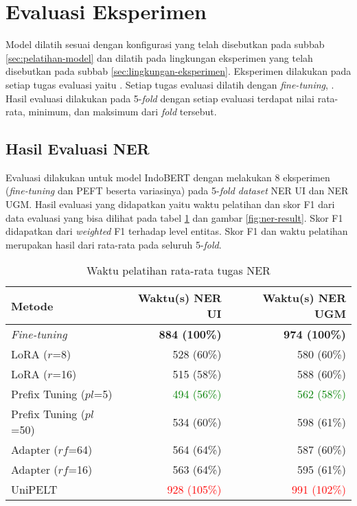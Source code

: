 \section{Evaluasi Eksperimen}

Model dilatih sesuai dengan konfigurasi yang telah disebutkan pada subbab \ref{sec:pelatihan-model} dan dilatih pada lingkungan eksperimen yang telah disebutkan pada subbab \ref{sec:lingkungan-eksperimen}. Eksperimen dilakukan pada setiap tugas evaluasi yaitu \nlptask. Setiap tugas evaluasi dilatih dengan \textit{fine-tuning}, \methodPEFT. Hasil evaluasi dilakukan pada 5-\textit{fold} dengan setiap evaluasi terdapat nilai rata-rata, minimum, dan maksimum dari \textit{fold} tersebut.

\subsection{Hasil Evaluasi NER}
\label{sec:ner-evaluation}

Evaluasi dilakukan untuk model IndoBERT dengan melakukan 8 eksperimen (\textit{fine-tuning} dan PEFT beserta variasinya) pada 5-\textit{fold dataset} NER UI dan NER UGM. Hasil evaluasi yang didapatkan yaitu waktu pelatihan dan skor F1 dari data evaluasi yang bisa dilihat pada tabel \ref{table:runtime-ner} dan gambar \ref{fig:ner-result}. Skor F1 didapatkan dari \textit{weighted} F1 terhadap level entitas. Skor F1 dan waktu pelatihan merupakan hasil dari rata-rata pada seluruh 5-\textit{fold}.

\begin{table}[h]
    \centering
    \caption{Waktu pelatihan rata-rata tugas NER}
    \label{table:runtime-ner}
    \begin{tabular}{l|r|r}
        \toprule
        \textbf{Metode} & \textbf{Waktu(s) NER UI} & \textbf{Waktu(s) NER UGM} \\
        \midrule
        \textit{Fine-tuning} & \textbf{884 (100\%)} & \textbf{974 (100\%)} \\
        LoRA ($r$=8) & 528 (60\%) & 580 (60\%) \\
        LoRA ($r$=16) & 515 (58\%) & 588 (60\%) \\
        Prefix Tuning ($pl$=5) & \textcolor{Green}{494 (56\%)} & \textcolor{Green}{562 (58\%)} \\
        Prefix Tuning ($pl$=50) & 534 (60\%) & 598 (61\%) \\
        Adapter ($rf$=64) & 564 (64\%) & 587 (60\%) \\
        Adapter ($rf$=16) & 563 (64\%) & 595 (61\%) \\
        UniPELT & \textcolor{Red}{928 (105\%)} & \textcolor{Red}{991 (102\%)} \\
        \bottomrule
    \end{tabular}
\end{table}

